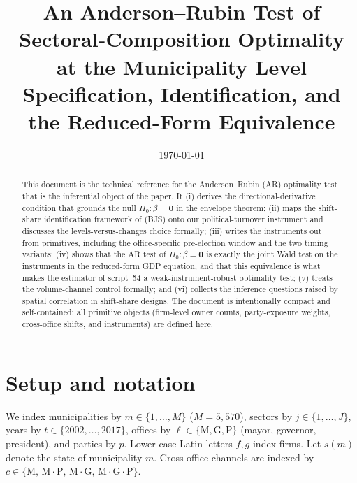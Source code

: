 \documentclass{article}
\newcommand{\bzero}{\mathbf{0}}
\theoremstyle{plain}
\theoremstyle{definition}
\theoremstyle{remark}
\begin{document}
\title{An Anderson--Rubin Test of Sectoral-Composition Optimality\\
       at the Municipality Level\\[2pt]
       \large Specification, Identification, and the Reduced-Form Equivalence}
\author{}
\date{\today}
\maketitle

\begin{abstract}
\noindent
This document is the technical reference for the Anderson--Rubin (AR) optimality
test that is the inferential object of the paper. It (i) derives the
directional-derivative condition that grounds the null
$H_0:\beta=\bzero$ in the envelope theorem; (ii) maps the shift-share
identification framework of \citet{borusyak2022quasi} (BJS) onto our political-turnover
instrument and discusses the levels-versus-changes choice formally; (iii) writes
the instruments out from primitives, including the office-specific
pre-election window and the two timing variants; (iv) shows that the AR test
of $H_0:\beta=\bzero$ is exactly the joint Wald test on the instruments in the
reduced-form GDP equation, and that this equivalence is what makes the
estimator of script~54 a weak-instrument-robust optimality test; (v) treats
the volume-channel control formally; and (vi) collects the inference questions
raised by spatial correlation in shift-share designs.
The document is intentionally compact and self-contained: all primitive
objects (firm-level owner counts, party-exposure weights, cross-office
shifts, and instruments) are defined here.
\end{abstract}

\setlength{\parskip}{6pt}
\setlength{\parindent}{12pt}

\section*{Setup and notation}\label{sec:notation}

We index municipalities by $m\in\{1,\dots,M\}$ ($M=5{,}570$), sectors by
$j\in\{1,\dots,J\}$, years by $t\in\{2002,\dots,2017\}$, offices by
$\ell\in\{\mathrm{M},\mathrm{G},\mathrm{P}\}$ (mayor, governor, president), and
parties by $p$. Lower-case Latin letters $f,g$ index firms. Let $s(m)$
denote the state of municipality $m$. Cross-office channels are indexed by
$c\in\{\mathrm{M},\,\mathrm{M{\cdot}P},\,\mathrm{M{\cdot}G},\,\mathrm{M{\cdot}G{\cdot}P}\}$.
\end{document}
